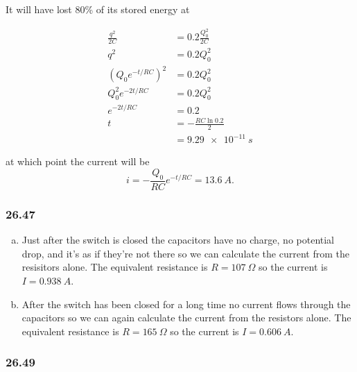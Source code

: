 \documentclass{article}
\begin{document}
It will have lost 80\% of its stored energy at

\begin{align*}
  \frac{q^2}{2 C}                   & = 0.2 \frac{Q_0^2}{2 C}  \\
  q^2                               & = 0.2 Q_0^2              \\
  \left( Q_0 e^{-t / R C} \right)^2 & = 0.2 Q_0^2              \\
  Q_0^2 e^{-2 t / R C}              & = 0.2 Q_0^2              \\
  e^{-2 t / R C}                    & = 0.2                    \\
  t                                 & = -\frac{R C \ln 0.2}{2} \\
                                    & = \qty{9.29e-11}{s}
\end{align*}

at which point the current will be \[i = -\frac{Q_0}{R C} e^{-t / R C} = \qty{13.6}{A}.\]

\subsubsection{26.47}

\begin{enumerate}[(a)]
  \item Just after the switch is closed the capacitors have no charge, no potential drop, and it's as if they're not there so we can calculate the current from the resisitors alone. The equivalent resistance is $R = \qty{107}{\Omega}$ so the current is $I = \qty{0.938}{A}$.

  \item After the switch has been closed for a long time no current flows through the capacitors so we can again calculate the current from the resistors alone. The equivalent resistance is $R = \qty{165}{\Omega}$ so the current is $I = \qty{0.606}{A}$.
\end{enumerate}

\subsubsection{26.49}
\end{document}

